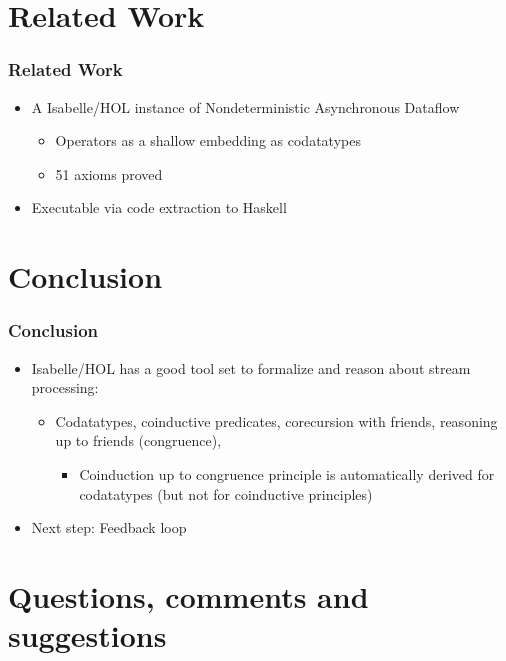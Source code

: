 \documentclass[fleqn,aspectratio=169,10pt]{beamer}
\begin{document}
\section{Related Work}

\begin{frame}[fragile]
  \frametitle{Related Work}
  \begin{itemize}
    \item A Isabelle/HOL instance of Nondeterministic Asynchronous Dataflow
          \begin{itemize}
            \item Operators as a shallow embedding as codatatypes
            \item 51 axioms proved
          \end{itemize}
    \item Executable via code extraction to Haskell
  \end{itemize}
\end{frame}

\section{Conclusion}
\begin{frame}
  \frametitle{Conclusion}
  \begin{itemize}
    \item Isabelle/HOL has a good tool set to formalize and reason about stream processing:
          \begin{itemize}
            \item Codatatypes, coinductive predicates, corecursion with friends, reasoning up to friends (congruence),
                  \begin{itemize}
                    \item Coinduction up to congruence principle is automatically derived for codatatypes (but not for coinductive principles)
                  \end{itemize}
          \end{itemize}
    \item Next step: Feedback loop
  \end{itemize}
\end{frame}

\section{Questions, comments and suggestions}
\end{document}
